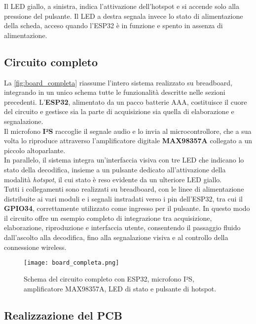 Il LED giallo, a sinistra, indica l’attivazione dell’hotspot e si accende solo alla pressione del pulsante.  
Il LED a destra segnala invece lo stato di alimentazione della scheda, acceso quando l’ESP32 è in funzione e spento in assenza di alimentazione.  
 
\subsection{Circuito completo}
\label{subsec:circuito_completo}

La \autoref{fig:board_completa} riassume l’intero sistema realizzato su breadboard, integrando in un 
unico schema tutte le funzionalità descritte nelle sezioni precedenti. L’\textbf{ESP32}, alimentato da 
un pacco batterie AAA, costituisce il cuore del circuito e gestisce sia la parte di acquisizione sia quella 
di elaborazione e segnalazione. \\
Il microfono \textbf{I²S} raccoglie il segnale audio e lo invia al microcontrollore, 
che a sua volta lo riproduce attraverso l’amplificatore digitale \textbf{MAX98357A} collegato a un piccolo altoparlante.\\
 In parallelo, il sistema integra un’interfaccia visiva con tre LED che indicano lo stato della decodifica, insieme a un
  pulsante dedicato all’attivazione della modalità \textit{hotspot}, il cui stato è reso evidente da un ulteriore LED giallo. \\
  Tutti i collegamenti sono realizzati su breadboard, con le linee di alimentazione distribuite ai vari moduli e i segnali instradati 
  verso i pin dell’ESP32, tra cui il \textbf{GPIO34}, correttamente utilizzato come ingresso per il pulsante.
  \newpage
   In questo modo il circuito 
  offre un esempio completo di integrazione tra acquisizione, elaborazione, riproduzione e interfaccia utente, consentendo il passaggio 
  fluido dall’ascolto alla decodifica, fino alla segnalazione visiva e al controllo della connessione wireless.

\begin{figure}[H]
  \centering
  \texttt{[image: board\_completa.png]}
  \caption{Schema del circuito completo con ESP32, microfono I²S, amplificatore MAX98357A, LED di stato e pulsante di hotspot.}
  \label{fig:board_completa}
\end{figure}

\subsection{Realizzazione del PCB}
\label{subsec:pcb_completo}

